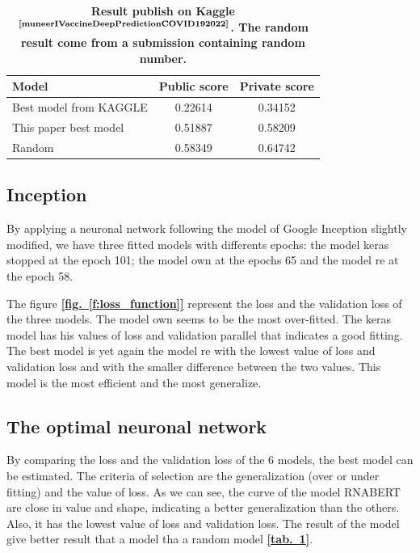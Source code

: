 \documentclass[12pt, oneside, a4paper]{report}
\newcommand{\fref}[1]{\hyperref[#1]{\textbf{[fig.~\ref*{#1}]}}}
\newcommand{\tref}[1]{\hyperref[#1]{\textbf{[tab.~\ref*{#1}]}}}
\newcommand{\p}[1]{$^\text{#1}$}
\newcommand{\Cite}[1]{\p{\textbf{\cite{#1}}}}
\begin{document}
\begin{multicols}{2}
\begin{table}[!tb]
    \centering
    \begin{minipage}{9.92cm}
        \caption{\textbf{Result publish on Kaggle\Cite{muneerIVaccineDeepPredictionCOVID192022}. The random result come from a submission containing random number.  
            \label{t:result_kaggle} \vspace{-1em}}}
    \end{minipage}

    \begin{tabular}{lcc}
        \toprule
        \bfseries Model             & \bfseries Public score        & \bfseries Private score\\
        \midrule
        Best model from KAGGLE      & 0.22614                       & 0.34152\\
        This paper best model       & 0.51887                       & 0.58209\\
        Random                      & 0.58349                       & 0.64742\\
        \bottomrule
    \end{tabular}
\end{table}

\subsection{Inception}
By applying a neuronal network following the model of Google Inception slightly modified, we have three fitted models with differents epochs: the model keras stopped at the epoch 101; the model own at the epochs 65 and the model re at the epoch 58.


The figure \fref{f:loss_function} represent the loss and the validation loss of the three models. The model own seems to be the most over-fitted. The keras model has his values of loss and validation parallel that indicates a good fitting.
The best model is yet again the model re with the lowest value of loss and validation loss and with the smaller difference between the two values. This model is the most efficient and the most generalize.

\subsection{The optimal neuronal network} 
By comparing the loss and the validation loss of the 6 models, the best model can be estimated. The criteria of selection are the generalization (over or under fitting) and the value of loss. As we can see, the curve of the model RNABERT are close in value and shape, indicating a better generalization than the others. Also, it has the lowest value of loss and validation loss. The result of the model give better result that a model tha a random model \tref{t:result_kaggle}.


\end{multicols}
\end{document}
